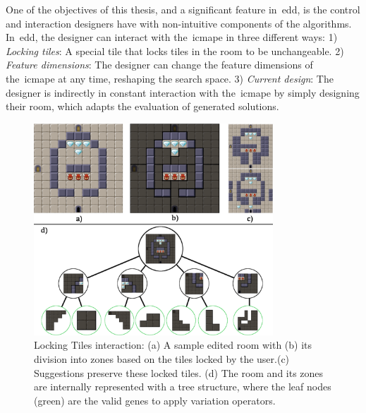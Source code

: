 One of the objectives of this thesis, and a significant feature in~\acrshort{edd}, is the control and interaction designers have with non-intuitive components of the algorithms. In~\acrshort{edd}, the designer can interact with the~\acrshort{icmape} in three different ways: 1) \emph{Locking tiles}: A special tile that locks tiles in the room to be unchangeable. 2) \emph{Feature dimensions}: The designer can change the feature dimensions of the~\acrshort{icmape} at any time, reshaping the search space. 3) \emph{Current design}: The designer is indirectly in constant interaction with the~\acrshort{icmape} by simply designing their room, which adapts the evaluation of generated solutions. 




\begin{figure}[!h]
\centerline{\includegraphics[width=0.8\textwidth]{figures/EDD-figs/map-representation-figure-test.png}}
\caption{Locking Tiles interaction: (a) A sample edited room with (b) its division into zones based on the tiles locked by the user.(c) Suggestions preserve these locked tiles. (d) The room and its zones are internally represented with a tree structure, where the leaf nodes (green) are the valid genes to apply variation operators.} \label{fig:lockTiles}
\end{figure}

